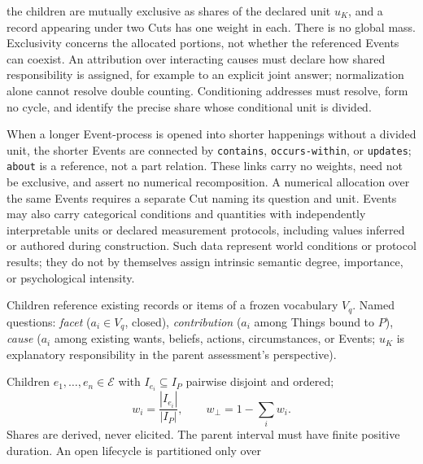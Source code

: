 \documentclass[11pt,a4paper]{article}
\newcommand{\Eset}{\mathcal E}
\begin{document}
\begin{description}
    the children are mutually exclusive as shares of the declared unit
    $u_K$, and a record appearing under two Cuts has one weight in each.
    There is no global mass. Exclusivity concerns the allocated portions,
    not whether the referenced Events can coexist. An attribution over
    interacting causes must declare how shared responsibility is assigned,
    for example to an explicit joint answer; normalization alone cannot
    resolve double counting. Conditioning addresses must resolve, form no
    cycle, and identify the precise share whose conditional unit is divided.
  \item[A5 Core---Event processes and world data.] When a longer Event-process is
    opened into shorter happenings without a divided unit, the shorter Events
    are connected by \texttt{contains}, \texttt{occurs-within}, or
    \texttt{updates}; \texttt{about} is a reference, not a part relation.
    These links carry no weights, need not
    be exclusive, and assert no numerical recomposition. A numerical allocation
    over the same Events requires a separate Cut naming its question and unit.
    Events may also carry categorical conditions and quantities with independently
    interpretable units or declared measurement protocols, including values
    inferred or authored during construction. Such data represent world
    conditions or protocol results; they do not by themselves assign intrinsic
    semantic degree, importance, or psychological intensity.
  \item[A6 Profile---Named Cut families.]
    \begin{description}[leftmargin=1.2em]
      \item[allocation] Children reference existing records or items of a
        frozen vocabulary $V_q$. Named questions: \emph{facet}
        ($a_i\in V_q$, closed), \emph{contribution} ($a_i$ among Things
        bound to $P$), \emph{cause} ($a_i$ among existing wants, beliefs,
        actions, circumstances, or Events; $u_K$ is explanatory
        responsibility in the parent assessment's perspective).
      \item[sequential] Children $e_1,\dots,e_n\in\Eset$ with
        $I_{e_i}\subseteq I_P$ pairwise disjoint and ordered;
        \begin{equation}
          w_i=\frac{|I_{e_i}|}{|I_P|},\qquad w_\bot=1-\sum_i w_i .
        \end{equation}
        Shares are derived, never elicited. The parent interval must have
        finite positive duration. An open lifecycle is partitioned only over

\end{description}
\end{description}
\end{document}
